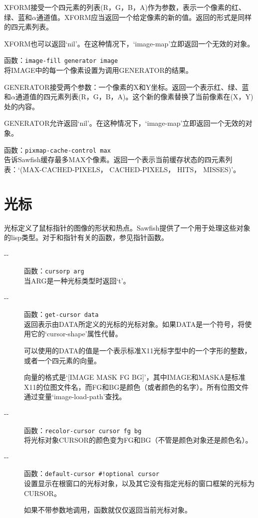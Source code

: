 \documentclass{book}
\begin{document}
\begin{CJK*}{UTF8}{gbsn}
\begin{description}
XFORM接受一个四元素的列表(R，G，B，A)作为参数，表示一个像素的红、绿、蓝和$\alpha $通道值。XFORM应当返回一个给定像素的新的值。返回的形式是同样的四元素列表。

XFORM也可以返回`nil'。在这种情况下，`image-map'立即返回一个无效的对象。
\item[-{}-] 函数：\verb|image-fill generator image|\\
将IMAGE中的每一个像素设置为调用GENERATOR的结果。

GENERATOR接受两个参数：一个像素的X和Y坐标。返回一个表示红、绿、蓝和$\alpha $通道值的四元素列表(R，G，B，A)。这个新的像素替换了当前像素在(X，Y)处的内容。

GENERATOR允许返回`nil'。在这种情况下，`image-map'立即返回一个无效的对象。
\item[-{}-] 函数：\verb|pixmap-cache-control max|\\
告诉Sawfish缓存最多MAX个像素。返回一个表示当前缓存状态的四元素列表：`(MAX-CACHED-PIXELS， CACHED-PIXELS， HITS， MISSES)'。
\end{description}
\chapter{光标}
光标定义了鼠标指针的图像的形状和热点。Sawfish提供了一个用于处理这些对象的lisp类型。对于和指针有关的函数，参见指针函数。
\begin{description}
\item[-{}-] 函数：\verb|cursorp arg|\\
当ARG是一种光标类型时返回`t'。
\item[-{}-] 函数：\verb|get-cursor data|\\
返回表示由DATA所定义的光标的光标对象。如果DATA是一个符号，将使用它的`cursor-shape'属性代替。

可以使用的DATA的值是一个表示标准X11光标字型中的一个字形的整数，或者一个四元素的向量。

向量的格式是`[IMAGE MASK FG BG]'，其中IMAGE和MASKA是标准X11的位图文件名，而FG和BG是颜色（或者颜色的名字）。所有位图文件通过变量`image-load-path'查找。
\item[-{}-] 函数：\verb|recolor-cursor cursor fg bg|\\
将光标对象CURSOR的颜色变为FG和BG（不管是颜色对象还是颜色名）。
\item[-{}-] 函数：\verb|default-cursor #!optional cursor|\\
设置显示在根窗口的光标对象，以及其它没有指定光标的窗口框架的光标为CURSOR。

如果不带参数地调用，函数就仅仅返回当前光标对象。
\end{description}


\end{CJK*}
\end{document}
